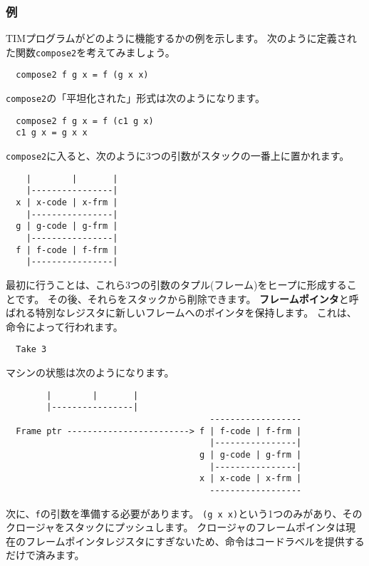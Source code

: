 \documentclass{jarticle}
\begin{document}
\subsubsection{例}

TIMプログラムがどのように機能するかの例を示します。
次のように定義された関数\texttt{compose2}を考えてみましょう。

\begin{verbatim}
  compose2 f g x = f (g x x)
\end{verbatim}

\texttt{compose2}の「平坦化された」形式は次のようになります。

\begin{verbatim}
  compose2 f g x = f (c1 g x)
  c1 g x = g x x
\end{verbatim}

\texttt{compose2}に入ると、次のように3つの引数がスタックの一番上に置かれます。

\begin{verbatim}
    |        |       |
    |----------------|
  x | x-code | x-frm |
    |----------------|
  g | g-code | g-frm |
    |----------------|
  f | f-code | f-frm |
    |----------------|
\end{verbatim}

最初に行うことは、これら3つの引数のタプル(フレーム)をヒープに形成することです。
その後、それらをスタックから削除できます。
\textbf{フレームポインタ}と呼ばれる特別なレジスタに新しいフレームへのポインタを保持します。
これは、命令によって行われます。

\begin{verbatim}
  Take 3
\end{verbatim}

マシンの状態は次のようになります。

\begin{verbatim}
        |        |       |
        |----------------|
                                        ------------------
  Frame ptr ------------------------> f | f-code | f-frm |
                                        |----------------|
                                      g | g-code | g-frm |
                                        |----------------|
                                      x | x-code | x-frm |
                                        ------------------
\end{verbatim}

次に、\texttt{f}の引数を準備する必要があります。
\texttt{(g x x)}という1つのみがあり、そのクロージャをスタックにプッシュします。
クロージャのフレームポインタは現在のフレームポインタレジスタにすぎないため、命令はコードラベルを提供するだけで済みます。
\end{document}
